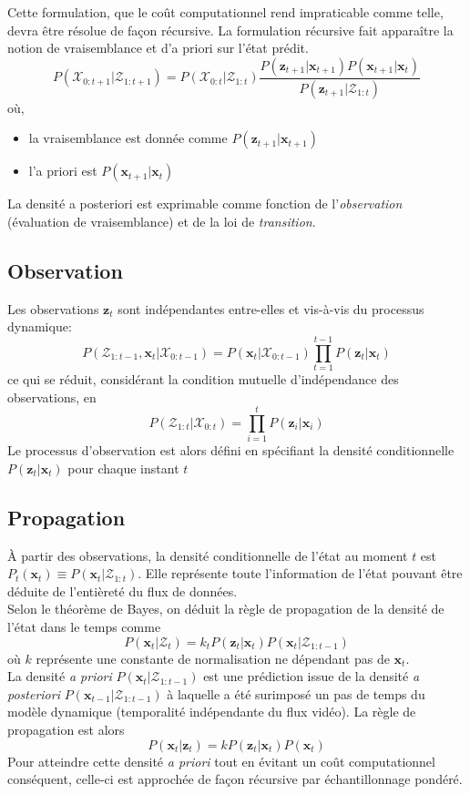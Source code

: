 \documentclass[a4paper,11pt]{report}
\begin{document}
Cette formulation, que le coût computationnel rend impraticable comme telle, devra être résolue de façon récursive. 
La formulation récursive fait apparaître la notion de vraisemblance et d'a priori sur l'état prédit.
$$P(\mathcal{X}_{0:t+1}|\mathcal{Z}_{1:t+1}) = P(\mathcal{X}_{0:t}|\mathcal{Z}_{1:t})\frac{P(\mathbf{z}_{t+1}|\mathbf{x}_{t+1})P(\mathbf{x}_{t+1}|\mathbf{x}_{t})}{P(\mathbf{z}_{t+1}|\mathcal{Z}_{1:t})}$$
où,
\begin{itemize}
\item[] la vraisemblance est donnée comme $P(\mathbf{z}_{t+1}|\mathbf{x}_{t+1})$
\item[] l'a priori est $P(\mathbf{x}_{t+1}|\mathbf{x}_{t})$\\
\end{itemize}

La densité a posteriori est exprimable comme fonction de l'\textit{observation} (évaluation de vraisemblance) et de la loi de \textit{transition}.

\subsection{Observation}
Les observations $\mathbf{z}_t$ sont indépendantes entre-elles et vis-à-vis du processus dynamique:
$$P(\mathcal{Z}_{1:t-1},\mathbf{x}_t|\mathcal{X}_{0:t-1}) = P(\mathbf{x}_t|\mathcal{X}_{0:t-1})\prod_{t=1}^{t-1} P(\mathbf{z}_t|\mathbf{x}_t)$$
ce qui se réduit, considérant la condition mutuelle d'indépendance des observations, en
$$P(\mathcal{Z}_{1:t}|\mathcal{X}_{0:t}) = \prod_{i=1}^{t} P(\mathbf{z}_i|\mathbf{x}_i)$$
Le processus d'observation est alors défini en spécifiant la densité conditionnelle $P(\mathbf{z}_t|\mathbf{x}_t)$ pour chaque instant $t$

\subsection{Propagation}
\`{A} partir des observations, la densité conditionnelle de l'état au moment $t$ est $P_t(\mathbf{x}_t) \equiv P(\mathbf{x}_t|\mathcal{Z}_ {1:t})$. Elle représente toute l'information de l'état pouvant être déduite de l'entièreté du flux de données.\\
Selon le théorème de Bayes, on déduit la règle de propagation de la densité de l'état dans le temps comme  
$$P(\mathbf{x}_{t}|\mathcal{Z}_{t}) = k_t P(\mathbf{z}_t|\mathbf{x}_t)P(\mathbf{x}_t|\mathcal{Z}_{1:t-1})$$
où $k$ représente une constante de normalisation ne dépendant pas de $\mathbf{x}_t$.\\
La densité \textit{a priori} $P(\mathbf{x}_t|\mathcal{Z}_{1:t-1})$ est une prédiction issue de la densité \textit{a posteriori} $P(\mathbf{x}_{t-1}|\mathcal{Z}_{1:t-1})$ à laquelle a été surimposé un pas de temps du modèle dynamique (temporalité indépendante du flux vidéo).
La règle de propagation est alors $$P(\mathbf{x}_t|\mathbf{z}_t) = kP(\mathbf{z}_t|\mathbf{x}_t)P(\mathbf{x}_t)$$
Pour atteindre cette densité \textit{a priori} tout en évitant un coût computationnel conséquent, celle-ci est approchée de façon récursive par échantillonnage pondéré.\\
\end{document}
